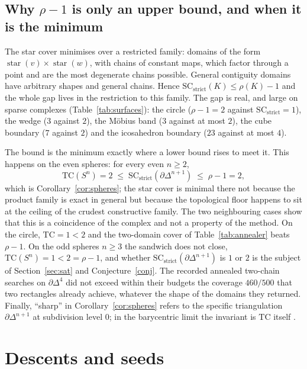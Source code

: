 \documentclass[12pt]{article}
\newcommand{\TC}{\mathrm{TC}}
\newcommand{\SC}{\mathrm{SC}}
\newcommand{\SCst}{\SC_{\mathrm{strict}}}
\begin{document}
\subsection{Why $\rho-1$ is only an upper bound, and when it is the
minimum}\label{sec:sharp}

The star cover minimises over a restricted family: domains of the form
$\operatorname{star}(v)\times\operatorname{star}(w)$, with chains of
constant maps, which factor through a point and are the most degenerate
chains possible.  General contiguity domains have arbitrary shapes and
general chains.  Hence $\SCst(K)\le\rho(K)-1$ and the whole gap lives in
the restriction to this family.  The gap is real, and large on sparse
complexes (Table~\ref{tab:surfaces}): the circle ($\rho-1=2$ against
$\SCst=1$), the wedge ($3$ against $2$), the M\"obius band ($3$ against
at most $2$), the cube boundary ($7$ against $2$) and the icosahedron
boundary ($23$ against at most $4$).

The bound is the minimum exactly where a lower bound rises to meet it.
This happens on the even spheres: for every even $n\ge2$,
\[
\TC(S^n)=2\;\le\;\SCst(\partial\Delta^{n+1})\;\le\;\rho-1=2,
\]
which is Corollary~\ref{cor:spheres}; the star cover is minimal there
not because the product family is exact in general but because the
topological floor happens to sit at the ceiling of the crudest
constructive family.  The two neighbouring cases show that this is a
coincidence of the complex and not a property of the method.  On the
circle, $\TC=1<2$ and the two-domain cover of Table~\ref{tab:annealer}
beats $\rho-1$.  On the odd spheres $n\ge3$ the sandwich does not close,
$\TC(S^n)=1<2=\rho-1$, and whether $\SCst(\partial\Delta^{n+1})$ is $1$
or $2$ is the subject of Section~\ref{sec:sat} and Conjecture~\ref{conj}.
The recorded annealed two-chain searches on $\partial\Delta^4$ did not
exceed within their budgets the coverage $460/500$ that two rectangles
already achieve, whatever the shape of the domains they returned.
Finally, ``sharp'' in Corollary~\ref{cor:spheres} refers to the
specific triangulation $\partial\Delta^{n+1}$ at subdivision level
$0$; in the barycentric limit the invariant is $\TC$ itself
\cite{G18}.

\section{Descents and seeds}\label{sec:descent}
\end{document}

